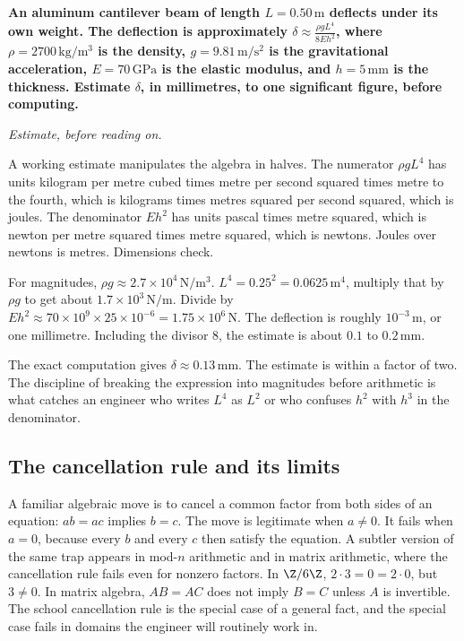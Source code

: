 \begin{estimation}
\textbf{An aluminum cantilever beam of length $L = 0.50 \,\si{\meter}$
deflects under its own weight. The deflection is approximately
$\delta \approx \frac{\rho g L^{4}}{8 E h^{2}}$, where $\rho =
2700 \,\si{\kilogram\per\meter\cubed}$ is the density, $g = 9.81
\,\si{\meter\per\second\squared}$ is the gravitational acceleration,
$E = 70 \,\si{\giga\pascal}$ is the elastic modulus, and $h = 5
\,\si{\milli\meter}$ is the thickness. Estimate $\delta$, in
millimetres, to one significant figure, before computing.}

\smallskip
\textit{Estimate, before reading on.}

\smallskip
A working estimate manipulates the algebra in halves. The numerator
$\rho g L^{4}$ has units kilogram per metre cubed times metre per
second squared times metre to the fourth, which is kilograms times
metres squared per second squared, which is joules. The denominator
$E h^{2}$ has units pascal times metre squared, which is newton per
metre squared times metre squared, which is newtons. Joules over
newtons is metres. Dimensions check.

For magnitudes, $\rho g \approx 2.7 \times 10^{4}
\,\si{\newton\per\meter\cubed}$. $L^{4} = 0.25^{2} = 0.0625
\,\si{\meter\tothe{4}}$, multiply that by $\rho g$ to get about
$1.7 \times 10^{3} \,\si{\newton\per\meter}$. Divide by $E h^{2}
\approx 70 \times 10^{9} \times 25 \times 10^{-6} = 1.75 \times
10^{6} \,\si{\newton}$. The deflection is roughly $10^{-3}
\,\si{\meter}$, or one millimetre. Including the divisor $8$, the
estimate is about $0.1$ to $0.2 \,\si{\milli\meter}$.

The exact computation gives $\delta \approx 0.13
\,\si{\milli\meter}$. The estimate is within a factor of two. The
discipline of breaking the expression into magnitudes before
arithmetic is what catches an engineer who writes $L^{4}$ as $L^{2}$
or who confuses $h^{2}$ with $h^{3}$ in the denominator.
\end{estimation}

\subsection{The cancellation rule and its limits}

A familiar algebraic move is to cancel a common factor from both
sides of an equation: $ab = ac$ implies $b = c$. The move is
legitimate when $a \neq 0$. It fails when $a = 0$, because every $b$
and every $c$ then satisfy the equation. A subtler version of the
same trap appears in mod-$n$ arithmetic and in matrix arithmetic,
where the cancellation rule fails even for nonzero factors. In
$\Z/6\Z$, $2 \cdot 3 = 0 = 2 \cdot 0$, but $3 \neq 0$. In matrix
algebra, $AB = AC$ does not imply $B = C$ unless $A$ is invertible.
The school cancellation rule is the special case of a general fact,
and the special case fails in domains the engineer will routinely
work in.

